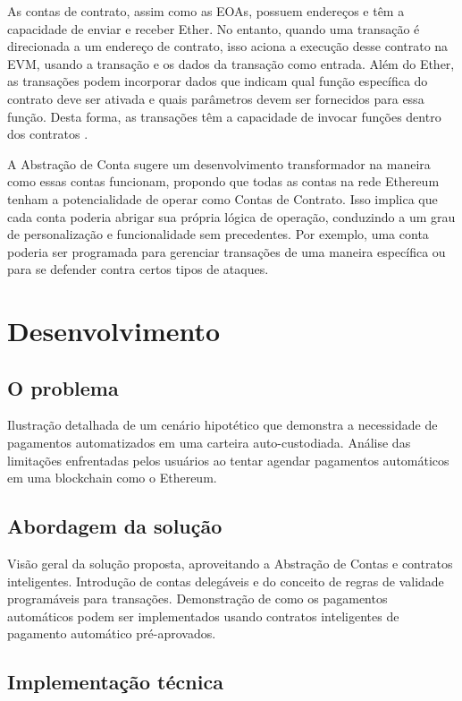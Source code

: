 \documentclass[12pt]{article}
\begin{document}
As contas de contrato, assim como as EOAs, possuem endereços e têm a capacidade de enviar e receber
Ether. No entanto, quando uma transação é direcionada a um endereço de contrato, isso aciona a
execução desse contrato na EVM, usando a transação e os dados da transação como entrada. Além do
Ether, as transações podem incorporar dados que indicam qual função específica do contrato deve ser
ativada e quais parâmetros devem ser fornecidos para essa função. Desta forma, as transações têm a
capacidade de invocar funções dentro dos contratos \cite{Antonopoulos2018}.

A Abstração de Conta sugere um desenvolvimento transformador na maneira como essas contas
funcionam, propondo que todas as contas na rede Ethereum tenham a potencialidade de operar como
Contas de Contrato. Isso implica que cada conta poderia abrigar sua própria lógica de operação,
conduzindo a um grau de personalização e funcionalidade sem precedentes. Por exemplo, uma conta
poderia ser programada para gerenciar transações de uma maneira específica ou para se defender
contra certos tipos de ataques.

\section{Desenvolvimento}

\subsection{O problema}

Ilustração detalhada de um cenário hipotético que demonstra a necessidade de pagamentos
automatizados em uma carteira auto-custodiada. Análise das limitações enfrentadas pelos usuários ao
tentar agendar pagamentos automáticos em uma blockchain como o Ethereum.

\subsection{Abordagem da solução}

Visão geral da solução proposta, aproveitando a Abstração de Contas e contratos inteligentes.
Introdução de contas delegáveis e do conceito de regras de validade programáveis para transações.
Demonstração de como os pagamentos automáticos podem ser implementados usando contratos
inteligentes de pagamento automático pré-aprovados.

\subsection{Implementação técnica}
\end{document}
